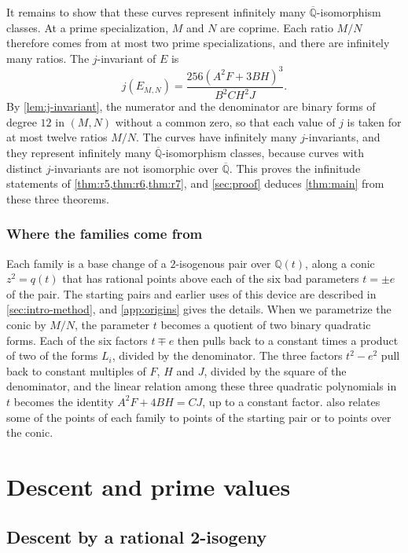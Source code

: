 \documentclass[12pt,oneside,openany]{book}
\theoremstyle{definition}
\theoremstyle{plain}
\numberwithin{equation}{chapter}
\theoremstyle{plain}
\theoremstyle{definition}
\theoremstyle{remark}
\newcommand{\Q}{\mathbb Q}
\newcommand{\Qbar}{\overline{\mathbb Q}}
\begin{document}
It remains to show that these curves represent infinitely many $\Qbar$-isomorphism classes. At a prime specialization, $M$ and $N$ are coprime. Each ratio $M/N$ therefore comes from at most two prime specializations, and there are infinitely many ratios. The $j$-invariant of $E$ is
\begin{equation*}
j(E_{M,N})=\frac{256(A^2F+3BH)^3}{B^2CH^2J}.
\end{equation*}
By \cref{lem:j-invariant}, the numerator and the denominator are binary forms of degree $12$ in $(M,N)$ without a common zero, so that each value of $j$ is taken for at most twelve ratios $M/N$. The curves have infinitely many $j$-invariants, and they represent infinitely many $\Qbar$-isomorphism classes, because curves with distinct $j$-invariants are not isomorphic over $\Qbar$. This proves the infinitude statements of \cref{thm:r5,thm:r6,thm:r7}, and \cref{sec:proof} deduces \cref{thm:main} from these three theorems.

\section{Where the families come from}\label{sec:overview-origin}

Each family is a base change of a $2$-isogenous pair over $\Q(t)$, along a conic $z^2=q(t)$ that has rational points above each of the six bad parameters $t=\pm e$ of the pair. The starting pairs and earlier uses of this device are described in \cref{sec:intro-method}, and \cref{app:origins} gives the details. When we parametrize the conic by $M/N$, the parameter $t$ becomes a quotient of two binary quadratic forms. Each of the six factors $t\mp e$ then pulls back to a constant times a product of two of the forms $L_i$, divided by the denominator. The three factors $t^2-e^2$ pull back to constant multiples of $F$, $H$ and $J$, divided by the square of the denominator, and the linear relation among these three quadratic polynomials in $t$ becomes the identity $A^2F+4BH=CJ$, up to a constant factor.  also relates some of the points of each family to points of the starting pair or to points over the conic.
\space%

\part{Descent and prime values}\label{part:tools}
\chapter{Descent by a rational 2-isogeny}\label{sec:descent}
\end{document}
